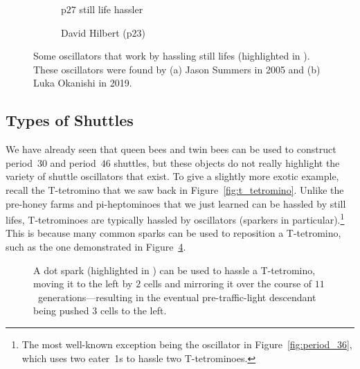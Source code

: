 \begin{figure}[!htb]
	\centering
	\begin{subfigure}{.52\textwidth}
		\centering
		\caption{p$27$ still life hassler}
		\label{fig:p27_hassler}
	\end{subfigure} \hfill %
	\begin{subfigure}{.44\textwidth}
		\centering
		\caption{David Hilbert (p$23$)}
		\label{fig:david_hilbert}
	\end{subfigure}
	\caption{Some oscillators that work by hassling still lifes (highlighted in ). These oscillators were found by (a) Jason Summers in 2005 and (b) Luka Okanishi in 2019.}\label{fig:still_life_hassler}
\end{figure}


\subsection{Types of Shuttles}\label{sec:shuttle_types}

We have already seen that queen bees and twin bees can be used to construct period~$30$ and period~$46$ shuttles, but these objects do not really highlight the variety of shuttle oscillators that exist. To give a slightly more exotic example, recall the T-tetromino that we saw back in Figure~\ref{fig:t_tetromino}. Unlike the pre-honey farms and pi-heptominoes that we just learned can be hassled by still lifes, T-tetrominoes are typically hassled by oscillators (sparkers in particular).\footnote{The most well-known exception being the oscillator in Figure~\ref{fig:period_36}, which uses two eater~1s to hassle two T-tetrominoes.} This is because many common sparks can be used to reposition a T-tetromino, such as the one demonstrated in Figure~\ref{fig:t_tetromino_hassle_1}.

\begin{figure}[!htb]
	\centering
	\caption{A dot spark (highlighted in ) can be used to hassle a T-tetromino, moving it to the left by $2$ cells and mirroring it over the course of $11$~generations---resulting in the eventual pre-traffic-light descendant being pushed $3$ cells to the left.}\label{fig:t_tetromino_hassle_1}
\end{figure}

